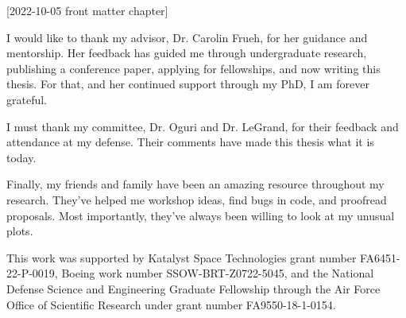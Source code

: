 [2022-10-05 front matter chapter]
%
%
%
%
%
%

%
%
%
\begin{statement}
\end{statement}




\begin{acknowledgments}
  I would like to thank my advisor, Dr. Carolin Frueh, for her guidance and mentorship. Her feedback has guided me through undergraduate research, publishing a conference paper, applying for fellowships, and now writing this thesis. For that, and her continued support through my PhD, I am forever grateful.

  I must thank my committee, Dr. Oguri and Dr. LeGrand, for their feedback and attendance at my defense. Their comments have made this thesis what it is today.

  Finally,  my friends and family have been an amazing resource throughout my research. They've helped me workshop ideas, find bugs in code, and proofread proposals. Most importantly, they've always been willing to look at my unusual plots.

  This work was supported by Katalyst Space Technologies grant number FA6451-22-P-0019, Boeing work number SSOW-BRT-Z0722-5045, and the National Defense Science and Engineering Graduate Fellowship through the Air Force Office of Scientific Research under grant number FA9550-18-1-0154.
\end{acknowledgments}

